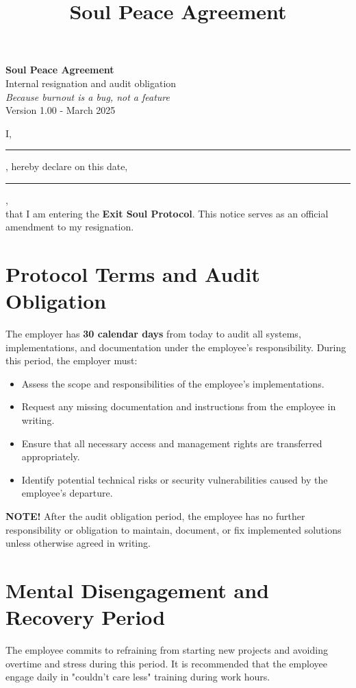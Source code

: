\documentclass[a4paper,11pt]{article}
\title{Soul Peace Agreement}
\date{}
\begin{document}
\pagestyle{empty}

\begin{center}
    {\LARGE \textbf{Soul Peace Agreement}}\\[1em]
    {\large Internal resignation and audit obligation}\\[0.5em]
    \textit{Because burnout is a bug, not a feature}\\[0.5em]
    {\small Version 1.00 - March 2025}
\end{center}

\vspace{2em}

I, \rule{7cm}{0.2pt}, hereby declare on this date, \rule{4cm}{0.2pt},\\
that I am entering the \textbf{Exit Soul Protocol}. This notice serves as an official amendment to my resignation.

\section*{Protocol Terms and Audit Obligation}

The employer has \textbf{30 calendar days} from today to audit all systems, implementations, and documentation under the employee’s responsibility. During this period, the employer must:

\begin{itemize}
    \item Assess the scope and responsibilities of the employee's implementations.
    \item Request any missing documentation and instructions from the employee in writing.
    \item Ensure that all necessary access and management rights are transferred appropriately.
    \item Identify potential technical risks or security vulnerabilities caused by the employee’s departure.
\end{itemize}

\textbf{NOTE!} After the audit obligation period, the employee has no further responsibility or obligation to maintain, document, or fix implemented solutions unless otherwise agreed in writing.

\section*{Mental Disengagement and Recovery Period}

The employee commits to refraining from starting new projects and avoiding overtime and stress during this period. It is recommended that the employee engage daily in "couldn't care less" training during work hours.
\end{document}
